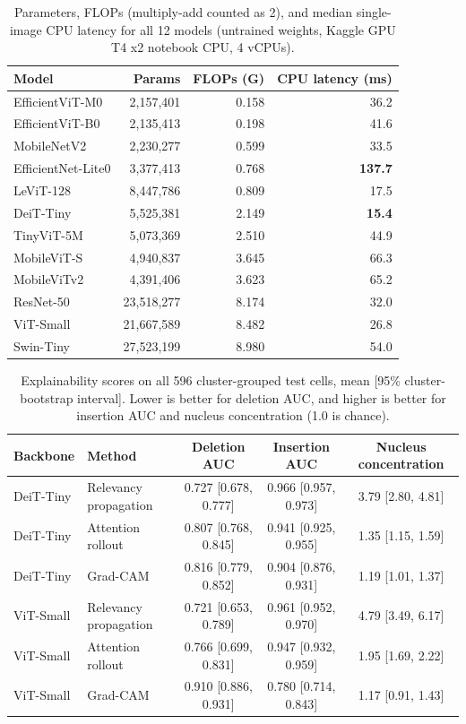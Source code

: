 \documentclass[12pt,letterpaper]{article}
\begin{document}
\begin{table}[htbp]
\centering
\caption{Parameters, FLOPs (multiply-add counted as 2), and median single-image CPU latency for all 12 models (untrained weights, Kaggle GPU T4 x2 notebook CPU, 4 vCPUs).}
\label{tab:eff}
\small
\begin{tabular}{lrrr}
\toprule
Model & Params & FLOPs (G) & CPU latency (ms) \\
\midrule
EfficientViT-M0 & 2{,}157{,}401 & 0.158 & 36.2 \\
EfficientViT-B0 & 2{,}135{,}413 & 0.198 & 41.6 \\
MobileNetV2 & 2{,}230{,}277 & 0.599 & 33.5 \\
EfficientNet-Lite0 & 3{,}377{,}413 & 0.768 & \textbf{137.7} \\
LeViT-128 & 8{,}447{,}786 & 0.809 & 17.5 \\
DeiT-Tiny & 5{,}525{,}381 & 2.149 & \textbf{15.4} \\
TinyViT-5M & 5{,}073{,}369 & 2.510 & 44.9 \\
MobileViT-S & 4{,}940{,}837 & 3.645 & 66.3 \\
MobileViTv2 & 4{,}391{,}406 & 3.623 & 65.2 \\
ResNet-50 & 23{,}518{,}277 & 8.174 & 32.0 \\
ViT-Small & 21{,}667{,}589 & 8.482 & 26.8 \\
Swin-Tiny & 27{,}523{,}199 & 8.980 & 54.0 \\
\bottomrule
\end{tabular}
\end{table}

\begin{table}[htbp]
\centering
\caption{Explainability scores on all 596 cluster-grouped test cells, mean [95\% cluster-bootstrap interval]. Lower is better for deletion AUC, and higher is better for insertion AUC and nucleus concentration (1.0 is chance).}
\label{tab:xai-full}
\footnotesize
\begin{tabular}{@{}llccc@{}}
\toprule
Backbone & Method & Deletion AUC & Insertion AUC & Nucleus concentration \\
\midrule
DeiT-Tiny & Relevancy propagation & 0.727 [0.678, 0.777] & 0.966 [0.957, 0.973] & 3.79 [2.80, 4.81] \\
DeiT-Tiny & Attention rollout & 0.807 [0.768, 0.845] & 0.941 [0.925, 0.955] & 1.35 [1.15, 1.59] \\
DeiT-Tiny & Grad-CAM & 0.816 [0.779, 0.852] & 0.904 [0.876, 0.931] & 1.19 [1.01, 1.37] \\
\addlinespace
ViT-Small & Relevancy propagation & 0.721 [0.653, 0.789] & 0.961 [0.952, 0.970] & 4.79 [3.49, 6.17] \\
ViT-Small & Attention rollout & 0.766 [0.699, 0.831] & 0.947 [0.932, 0.959] & 1.95 [1.69, 2.22] \\
ViT-Small & Grad-CAM & 0.910 [0.886, 0.931] & 0.780 [0.714, 0.843] & 1.17 [0.91, 1.43] \\
\bottomrule
\end{tabular}
\end{table}
\end{document}
